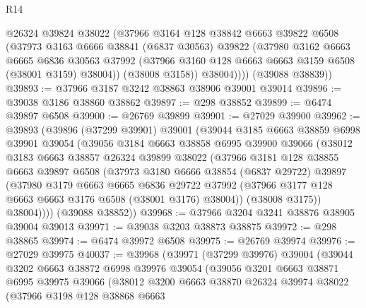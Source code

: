 \begin{lexlean}{R14}
\begin{coremodule}
            @26324
            @39824
            @38022
            (@37966
              @3164
              @128
              @38842
              @6663
              @39822
              @6508
              (@37973
                @3163
                @6666
                @38841
                (@6837 @30563)
                @39822
                (@37980
                  @3162
                  @6663
                  @6665
                  @6836
                  @30563
                  @37992
                  (@37966 @3160 @128 @6663 @6663 @3159 @6508 (@38001 @3159) @38004))
                (@38008 @3158))
              @38004))))
      (@39088 @38839))
@39893 := @37966 @3187 @3242 @38863 @38906 @39001 @39014
@39896 := @39038 @3186 @38860 @38862
@39897 := @298 @38852
@39899 := @6474 @39897 @6508
@39900 := @26769 @39899
@39901 := @27029 @39900
@39962 := @39893
    (@39896
      (@37299 @39901)
      @39001
      (@39044
        @3185
        @6663
        @38859
        @6998
        @39901
        @39054
        (@39056
          @3184
          @6663
          @38858
          @6995
          @39900
          @39066
          (@38012
            @3183
            @6663
            @38857
            @26324
            @39899
            @38022
            (@37966
              @3181
              @128
              @38855
              @6663
              @39897
              @6508
              (@37973
                @3180
                @6666
                @38854
                (@6837 @29722)
                @39897
                (@37980
                  @3179
                  @6663
                  @6665
                  @6836
                  @29722
                  @37992
                  (@37966 @3177 @128 @6663 @6663 @3176 @6508 (@38001 @3176) @38004))
                (@38008 @3175))
              @38004))))
      (@39088 @38852))
@39968 := @37966 @3204 @3241 @38876 @38905 @39004 @39013
@39971 := @39038 @3203 @38873 @38875
@39972 := @298 @38865
@39974 := @6474 @39972 @6508
@39975 := @26769 @39974
@39976 := @27029 @39975
@40037 := @39968
    (@39971
      (@37299 @39976)
      @39004
      (@39044
        @3202
        @6663
        @38872
        @6998
        @39976
        @39054
        (@39056
          @3201
          @6663
          @38871
          @6995
          @39975
          @39066
          (@38012
            @3200
            @6663
            @38870
            @26324
            @39974
            @38022
            (@37966
              @3198
              @128
              @38868
              @6663

\end{coremodule}
\end{lexlean}
